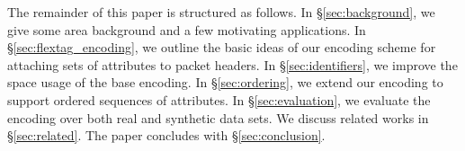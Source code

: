 
The remainder of this paper is structured as follows. In \S \ref{sec:background}, we give some area background and a few motivating applications. In \S \ref{sec:flextag_encoding}, we outline the basic ideas of our encoding scheme for attaching sets of attributes to packet headers. In \S \ref{sec:identifiers}, we improve the space usage of the base encoding. In \S \ref{sec:ordering}, we extend our encoding to support ordered sequences of attributes. In \S \ref{sec:evaluation}, we evaluate the encoding over both real and synthetic data sets. We discuss related works in \S \ref{sec:related}. The paper concludes with \S \ref{sec:conclusion}.






%

